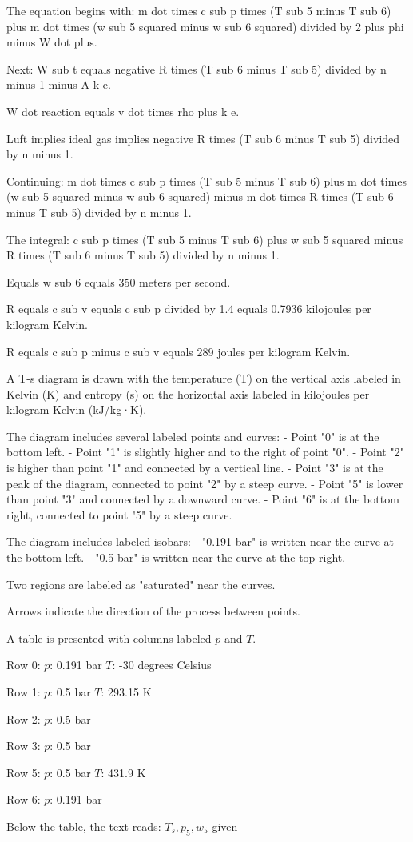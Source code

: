 The equation begins with:  
m dot times c sub p times (T sub 5 minus T sub 6) plus m dot times (w sub 5 squared minus w sub 6 squared) divided by 2 plus phi minus W dot plus.  

Next:  
W sub t equals negative R times (T sub 6 minus T sub 5) divided by n minus 1 minus A k e.  

W dot reaction equals v dot times rho plus k e.  

Luft implies ideal gas implies negative R times (T sub 6 minus T sub 5) divided by n minus 1.  

Continuing:  
m dot times c sub p times (T sub 5 minus T sub 6) plus m dot times (w sub 5 squared minus w sub 6 squared) minus m dot times R times (T sub 6 minus T sub 5) divided by n minus 1.  

The integral:  
c sub p times (T sub 5 minus T sub 6) plus w sub 5 squared minus R times (T sub 6 minus T sub 5) divided by n minus 1.  

Equals w sub 6 equals 350 meters per second.  

R equals c sub v equals c sub p divided by 1.4 equals 0.7936 kilojoules per kilogram Kelvin.  

R equals c sub p minus c sub v equals 289 joules per kilogram Kelvin.

A T-s diagram is drawn with the temperature (T) on the vertical axis labeled in Kelvin (K) and entropy (s) on the horizontal axis labeled in kilojoules per kilogram Kelvin (kJ/kg·K).  

The diagram includes several labeled points and curves:  
- Point "0" is at the bottom left.  
- Point "1" is slightly higher and to the right of point "0".  
- Point "2" is higher than point "1" and connected by a vertical line.  
- Point "3" is at the peak of the diagram, connected to point "2" by a steep curve.  
- Point "5" is lower than point "3" and connected by a downward curve.  
- Point "6" is at the bottom right, connected to point "5" by a steep curve.  

The diagram includes labeled isobars:  
- "0.191 bar" is written near the curve at the bottom left.  
- "0.5 bar" is written near the curve at the top right.  

Two regions are labeled as "saturated" near the curves.  

Arrows indicate the direction of the process between points.

A table is presented with columns labeled \( p \) and \( T \).  

Row 0:  
\( p \): 0.191 bar  
\( T \): -30 degrees Celsius  

Row 1:  
\( p \): 0.5 bar  
\( T \): 293.15 K  

Row 2:  
\( p \): 0.5 bar  

Row 3:  
\( p \): 0.5 bar  

Row 5:  
\( p \): 0.5 bar  
\( T \): 431.9 K  

Row 6:  
\( p \): 0.191 bar  

Below the table, the text reads:  
\( T_s, p_5, w_5 \) given